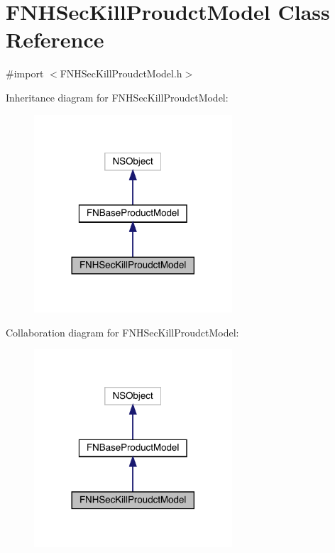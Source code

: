 \hypertarget{interface_f_n_h_sec_kill_proudct_model}{}\section{F\+N\+H\+Sec\+Kill\+Proudct\+Model Class Reference}
\label{interface_f_n_h_sec_kill_proudct_model}


{\ttfamily \#import $<$F\+N\+H\+Sec\+Kill\+Proudct\+Model.\+h$>$}



Inheritance diagram for F\+N\+H\+Sec\+Kill\+Proudct\+Model\+:\nopagebreak
\begin{figure}[H]
\begin{center}
\leavevmode
\includegraphics[width=209pt]{interface_f_n_h_sec_kill_proudct_model__inherit__graph}
\end{center}
\end{figure}


Collaboration diagram for F\+N\+H\+Sec\+Kill\+Proudct\+Model\+:\nopagebreak
\begin{figure}[H]
\begin{center}
\leavevmode
\includegraphics[width=209pt]{interface_f_n_h_sec_kill_proudct_model__coll__graph}
\end{center}
\end{figure}
